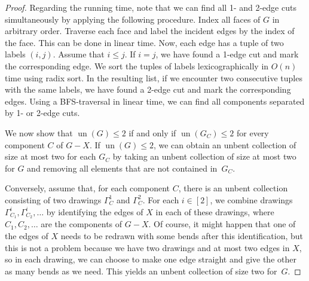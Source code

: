 \documentclass[runningheads]{llncs}
\newcommand{\un}{\operatorname{un}}
\begin{document}
\begin{proof}
    Regarding the running time,
    note that we can find all 1- and 2-edge cuts simultaneously
    by applying the following procedure.
    Index all faces of $G$ in arbitrary order.
    Traverse each face and label the incident edges by the index of the face.
    This can be done in linear time.
    Now, each edge has a tuple of two labels $(i, j)$.
    Assume that $i \le j$.
    If $i = j$, we have found a 1-edge cut and mark the corresponding edge.
    We sort the tuples of labels lexicographically in $O(n)$ time
    using radix sort.
    In the resulting list, if we encounter two consecutive tuples
    with the same labels, we have found a 2-edge cut and mark the corresponding edges.
    Using a BFS-traversal in linear time,
    we can find all components separated by 1- or 2-edge cuts.

    We now show that $\un(G) \leq 2$ if and only if $\un(G_C) \leq 2$ for every component $C$ of $G - X$.
    If $\un(G) \leq 2$, we can obtain
    an unbent collection of size at most two for each $G_C$
    by taking an unbent collection of size at most two for $G$
    and removing all elements that are not contained in~$G_C$.
    
    Conversely, assume that, for each component $C$,
    there is an unbent collection consisting of
    two drawings $\Gamma_C^1$ and $\Gamma_C^2$.
    For each $i \in [2]$,
    we combine drawings $\Gamma_{C_1}^i, \Gamma_{C_2}^i, \dots$
    by identifying the edges of $X$ in each of these drawings,
    where $C_1, C_2, \dots$ are the components of $G-X$. Of course, it might happen that one of the edges of $X$ needs to be redrawn with some bends after this identification, but this is not a problem because we have two drawings and at most two edges in $X$, so in each drawing, we can choose to make one edge straight and give the other as many bends as we need.
    This yields an unbent collection of size two for~$G$.
\end{proof}




\BalancedColoring*
\label{the:balancedColoringCharacterization*}
\end{document}
